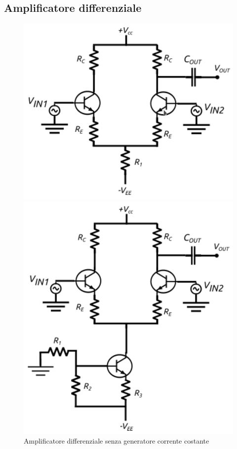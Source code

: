 \subsection{Amplificatore differenziale}

\begin{figure}[h]
    \centering
    \begin{minipage}{0.49\textwidth}
        \centering
        \includegraphics[width=\textwidth]{amp_diff_circ.png} 
        \caption{Amplificatore differenziale senza gene\-ratore corrente costante}
        \label{fig:ampdiff_circ}
    \end{minipage}\hfill
    \begin{minipage}{0.49\textwidth}
        \centering
        \includegraphics[width=\textwidth]{amp_diff_cc_circ.png} 

\end{minipage}
\end{figure}
